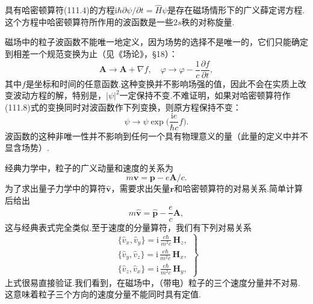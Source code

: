 具有哈密顿算符(111.4)的方程$\mathrm{i}\hbar\partial\psi/\partial t=\hat{H}\psi$是存在磁场情形下的广义薛定谔方程.这个方程中哈密顿算符所作用的波函数是一些$2s$秩的对称旋量.

磁场中的粒子波函数不能唯一地定义，因为场势的选择不是唯一的，它们只能确定到相差一个规范变换为止（见《场论》，§18）：
\begin{equation}
  \boldsymbol{A}\longrightarrow\boldsymbol{A}+\nabla f,\quad
  \varphi\longrightarrow\varphi-\frac{1}{c}\frac{\partial f}{\partial t},
\end{equation}
其中$f$是坐标和时间的任意函数.这种变换并不影响场强的值，因此不会在实质上改变波动方程的解，特别是，$|\psi|^2$一定保持不变.不难证明，如果对哈密顿算符作(111.8)式的变换同时对波函数作下列变换，则原方程保持不变：
\begin{equation}
  \psi\to\psi\exp\biggl(\frac{\mathrm{i}e}{\hbar c}f\biggr).
\end{equation}
波函数的这种非唯一性并不影响到任何一个具有物理意义的量（此量的定义中并不显含场势）.

经典力学中，粒子的广义动量和速度的关系为
\begin{equation*}
  m\boldsymbol{v}=\boldsymbol{p}-e\boldsymbol{A}/c.
\end{equation*}
为了求出量子力学中的算符$\hat{\boldsymbol{v}}$，需要求出矢量$\boldsymbol{r}$和哈密顿算符的对易关系.简单计算后给出
\begin{equation}
  m\hat{\boldsymbol{v}}=\hat{\boldsymbol{p}}-\frac{e}{c}\boldsymbol{A},
\end{equation}
这与经典表式完全类似.至于速度的分量算符，我们有下列对易关系
\begin{equation}
  \left.\begin{array}{l}
  \{\hat{v}_x,\hat{v}_y\}=\mathrm{i}\,\frac{e\hbar}{m^2c}\,\boldsymbol{H}_z,\\
  \{\hat{v}_y,\hat{v}_z\}=\mathrm{i}\,\frac{e\hbar}{m^2c}\,\boldsymbol{H}_x,\\
  \{\hat{v}_z,\hat{v}_x\}=\mathrm{i}\,\frac{e\hbar}{m^2c}\,\boldsymbol{H}_y,
  \end{array}\right\}
\end{equation}
上式很易直接验证.我们看到，在磁场中，（带电）粒子的三个速度分量并不对易.这意味着粒子三个方向的速度分量不能同时具有定值.

